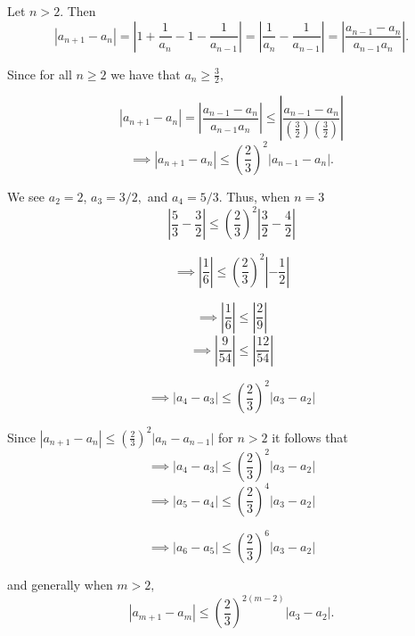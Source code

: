 \documentclass{report}
\begin{document}
\begin{myproof}
    
Let $n>2$. Then $$ \left| a_{n+1}  - a_{n} \right| 
= \left| 1 + \frac{1}{a_{n}}  - 1 - \frac{1}{a_{n-1}} \right| = \left|\frac{1}{a_{n}}  - \frac{1}{a_{n-1}} \right| = \left|\frac{ a_{n-1 } - a_n }{a_{n-1} a_n}   \right|.$$

Since for all $n\geq2$ we have that $a_n \geq \frac{3}{2},$

$$ \left| a_{n+1}  - a_{n} \right| =\left|\frac{ a_{n-1 } - a_n }{a_{n-1} a_n}\right| \leq \left|\frac{ a_{n-1 } - a_n }{\left(\frac{3}{2}\right) \left(\frac{3}{2}\right)}\right|$$
$$ \implies \left| a_{n+1}  - a_{n} \right|  \leq \left(\frac{2}{3}\right)^2\left|a_{n-1 } - a_n \right|.$$

\end{myproof}

\pagebreak
{}

\sol
\begin{myproof}
    
We see  $a_2 = 2$, $a_3 = 3/2,$ and $a_4 = 5/3$.  Thus, when $n=3$
$$\left|\frac{5}{3} - \frac{3}{2} \right| \leq \left(\frac{2}{3} \right)^2 \left|\frac{3}{2} - \frac{4}{2} \right|$$

$$\implies \left|\frac{1}{6}  \right| \leq \left(\frac{2}{3} \right)^2 \left| - \frac{1}{2} \right|$$

$$\implies \left|\frac{1}{6}  \right| \leq \left|\frac{2}{9} \right|$$
$$\implies \left|\frac{9}{54}  \right| \leq \left|\frac{12}{54} \right|$$

$$\implies \left|a_4 - a_3 \right| \leq \left(\frac{2}{3} \right)^2 \left|a_3 - a_2 \right|$$

Since $\left|a_{n+1}-a_n\right| \leq\left(\frac{2}{3}\right)^2\left|a_n-a_{n-1}\right|$ for $n>2$ it follows that
$$\implies \left|a_{4} - a_3\right| \leq \left(\frac{2}{3}\right)^2 \left|a_3 -a_2\right|$$
$$\implies \left|a_{5} - a_4\right| \leq \left(\frac{2}{3}\right)^4 \left|a_3 -a_2\right|$$

$$\implies \left|a_{6} - a_5\right| \leq \left(\frac{2}{3}\right)^6 \left|a_3 -a_2\right|$$

and generally when $m>2,$
$$ \left|a_{m+1} - a_m\right| \leq \left(\frac{2}{3}\right)^{2(m-2)} \left|a_3 -a_2\right|.$$

\end{myproof}
\pagebreak
{}
\end{document}
